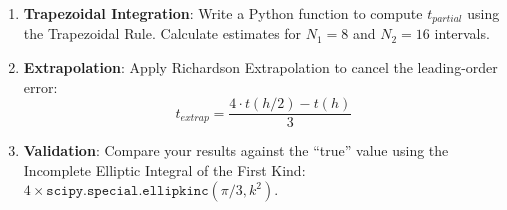 \begin{enumerate}
    \item \textbf{Trapezoidal Integration}: Write a Python function to compute $t_{partial}$ using the Trapezoidal Rule. Calculate estimates for $N_1=8$ and $N_2=16$ intervals.
    \item \textbf{Extrapolation}: Apply Richardson Extrapolation to cancel the leading-order error:
    $$ t_{extrap} = \frac{4 \cdot t(h/2) - t(h)}{3} $$
    \item \textbf{Validation}: Compare your results against the ``true'' value using the Incomplete Elliptic Integral of the First Kind: $4 \times \texttt{scipy.special.ellipkinc}(\pi/3, k^2)$.
\end{enumerate}

